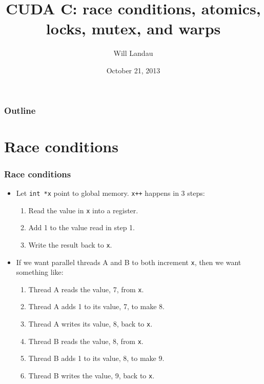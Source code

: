 \documentclass[handout]{beamer}
\title{CUDA C: race conditions, atomics, locks, mutex, and warps}
\author{Will Landau}
\date{October 21, 2013}
\institute{Iowa State University}
\numberwithin{equation}{section}
\begin{document}
\begin{frame}
\titlepage
 \end{frame}
 
 \begin{frame}
\frametitle{Outline}
\tableofcontents
\end{frame}
 

\section{Race conditions}

\begin{frame}
\frametitle{Race conditions}
\begin{itemize}
\item Let {\tt int *x} point to global memory. {\tt *x++} happens in 3 steps:
\begin{enumerate}
\pause \item Read the value in {\tt *x} into a register.
\pause \item Add 1 to the value read in step 1.
\pause \item Write the result back to {\tt *x}.
\end{enumerate}
\pause \item If we want parallel threads A and B to both increment {\tt *x}, then we want something like:
\begin{enumerate}
\pause \item Thread A reads the value, 7, from {\tt *x}.
\pause \item Thread A adds 1 to its value, 7, to make 8.
\pause \item Thread A writes its value, 8, back to {\tt *x}.
\pause \item Thread B reads the value, 8, from {\tt *x}.
\pause \item Thread B adds 1 to its value, 8, to make 9.
\pause \item Thread B writes the value, 9, back to {\tt *x}.
\end{enumerate}
\end{itemize}
\end{frame}
\end{document}
